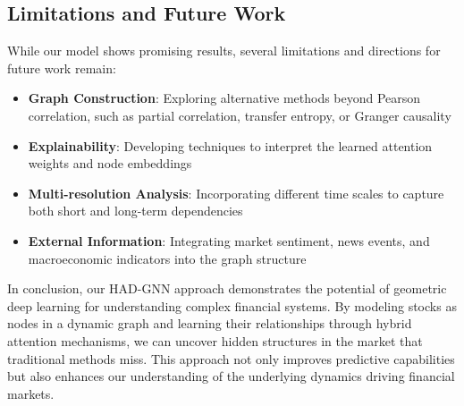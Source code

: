 \documentclass[12pt]{article}
\begin{document}
\subsection{Limitations and Future Work}

While our model shows promising results, several limitations and directions for future work remain:

\begin{itemize}
    \item \textbf{Graph Construction}: Exploring alternative methods beyond Pearson correlation, such as partial correlation, transfer entropy, or Granger causality
    \item \textbf{Explainability}: Developing techniques to interpret the learned attention weights and node embeddings
    \item \textbf{Multi-resolution Analysis}: Incorporating different time scales to capture both short and long-term dependencies
    \item \textbf{External Information}: Integrating market sentiment, news events, and macroeconomic indicators into the graph structure
\end{itemize}

In conclusion, our HAD-GNN approach demonstrates the potential of geometric deep learning for understanding complex financial systems. By modeling stocks as nodes in a dynamic graph and learning their relationships through hybrid attention mechanisms, we can uncover hidden structures in the market that traditional methods miss. This approach not only improves predictive capabilities but also enhances our understanding of the underlying dynamics driving financial markets.
\end{document}
